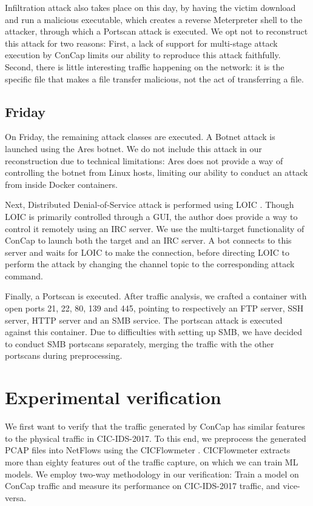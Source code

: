 \documentclass[conference]{IEEEtran}
\begin{document}
	Infiltration attack also takes place on this day, by having the victim download and run a malicious executable, which creates a reverse Meterpreter shell to the attacker, through which a Portscan attack is executed. We opt not to reconstruct this attack for two reasons: First, a lack of support for multi-stage attack execution by ConCap limits our ability to reproduce this attack faithfully. Second, there is little interesting traffic happening on the network: it is the specific file that makes a file transfer malicious, not the act of transferring a file. 
	
	\subsection{Friday}
	On Friday, the remaining attack classes are executed. 
	A Botnet attack is launched using the Ares \cite{ares} botnet. We do not include this attack in our reconstruction due to technical limitations: Ares does not provide a way of controlling the botnet from Linux hosts, limiting our ability to conduct an attack from inside Docker containers.
	
	Next, Distributed Denial-of-Service attack is performed using LOIC \cite{loic}. Though LOIC is primarily controlled through a GUI, the author does provide a way to control it remotely using an IRC server. We use the multi-target functionality of ConCap to launch both the target and an IRC server. A bot connects to this server and waits for LOIC to make the connection, before directing LOIC to perform the attack by changing the channel topic to the corresponding attack command.
	
	Finally, a Portscan is executed. After traffic analysis, we crafted a container with open ports 21, 22, 80, 139 and 445, pointing to respectively an FTP server, SSH server, HTTP server and an SMB service. The portscan attack is executed against this container. Due to difficulties with setting up SMB, we have decided to conduct SMB portscans separately, merging the traffic with the other portscans during preprocessing.

	
	\section{Experimental verification}\label{verification}
	
	We first want to verify that the traffic generated by ConCap has similar features to the physical traffic in CIC-IDS-2017. To this end, we preprocess the generated PCAP files into NetFlows using the CICFlowmeter \cite{cicflowmeter}. CICFlowmeter extracts more than eighty features out of the traffic capture, on which we can train ML models. We employ two-way methodology in our verification: Train a model on ConCap traffic and measure its performance on CIC-IDS-2017 traffic, and vice-versa.
	
\end{document}
